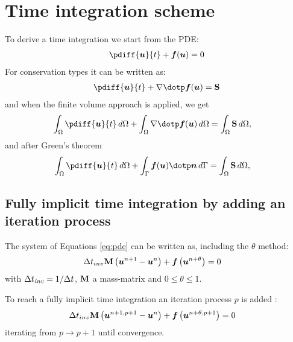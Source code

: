 \chapter{Time integration scheme}\label{sec:time_integration}
To derive a time integration we start from the PDE:
\begin{align}
    \pdiff{\vec{u}}{t} + \vec{f}(\vec{u}) = 0\label{eq:pde}
\end{align}
For conservation types it can be written as:
\begin{align}
    \pdiff{\vec{u}}{t} + \nabla \dotp \vec{f}(\vec{u}) = \mat{S}
\end{align}
and when the finite volume approach is applied, we get
\begin{align}
    \int_\Omega \pdiff{\vec{u}}{t}\, d\Omega + \int_\Omega \nabla \dotp \vec{f}(\vec{u})\, d\Omega&= \int_\Omega \mat{S}\, d\Omega,
\end{align}
and after Green's theorem
\begin{align}
    \int_\Omega \pdiff{\vec{u}}{t}\, d\Omega + \int_\Gamma \vec{f}(\vec{u}) \dotp \vec{n}\, d\Gamma&= \int_\Omega \mat{S}\, d\Omega,
\end{align}
\section{Fully implicit time integration by adding an iteration process}\label{sec:fully_implicit}
The system of Equations \eqref{eq:pde} can be written as, including the $\theta$ method:
\begin{align}
    &\Delta t_{inv} \mbox{\boldmath ${\rm M}$} \left( \mbox{\boldmath $u$}^{n+1} - \mbox{\boldmath $u$}^{n} \right)  +
    \mbox{\boldmath $f$} \left( \mbox{\boldmath $u$}^{n+\theta} \right) = 0 \label{eq:discretized}
\end{align}
with $\Delta t_{\it inv} = 1/\Delta t$, $\mbox{\boldmath ${\rm M}$}$ a mass-matrix and $0 \leq \theta \leq 1$.

To reach a fully implicit time integration an iteration process $p$ is added \citep[eqs.\ 15/16]{Borsboom2019a}:
\begin{align}
    &\Delta t_{inv} \mbox{\boldmath ${\rm M}$} \left( \mbox{\boldmath $u$}^{n+1,p+1} - \mbox{\boldmath $u$}^{n} \right)  +
    \mbox{\boldmath $f$} \left( \mbox{\boldmath $u$}^{n+\theta, p+1} \right) = 0
    \label{eq:1D_iteration}
\end{align}
iterating from $p \rightarrow p+1$ until convergence.

